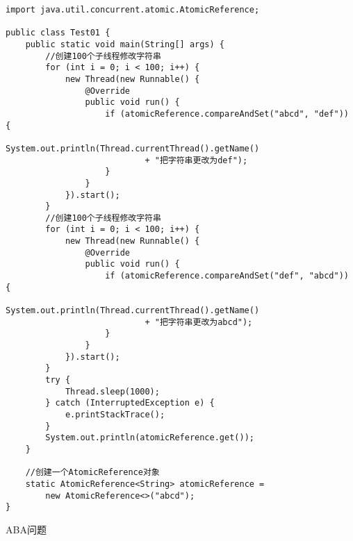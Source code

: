 \documentclass[a4paper]{report}
\begin{document}
\begin{Verbatim}[frame=single,numbersep=5pt,xleftmargin=1.5em,xrightmargin=1.5em]
import java.util.concurrent.atomic.AtomicReference;

public class Test01 {
    public static void main(String[] args) {
        //创建100个子线程修改字符串
        for (int i = 0; i < 100; i++) {
            new Thread(new Runnable() {
                @Override
                public void run() {
                    if (atomicReference.compareAndSet("abcd", "def")) {
                        System.out.println(Thread.currentThread().getName()
                            + "把字符串更改为def");
                    }
                }
            }).start();
        }
        //创建100个子线程修改字符串
        for (int i = 0; i < 100; i++) {
            new Thread(new Runnable() {
                @Override
                public void run() {
                    if (atomicReference.compareAndSet("def", "abcd")) {
                        System.out.println(Thread.currentThread().getName()
                            + "把字符串更改为abcd");
                    }
                }
            }).start();
        }
        try {
            Thread.sleep(1000);
        } catch (InterruptedException e) {
            e.printStackTrace();
        }
        System.out.println(atomicReference.get());
    }

    //创建一个AtomicReference对象
    static AtomicReference<String> atomicReference =
        new AtomicReference<>("abcd");
}\end{Verbatim}

ABA问题
\end{document}
